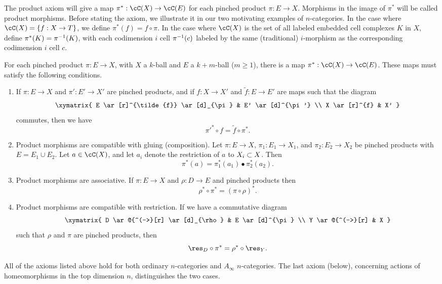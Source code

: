 The product axiom will give a map $\pi^*:\cC(X)\to \cC(E)$ for each pinched product
$\pi:E\to X$.
Morphisms in the image of $\pi^*$ will be called product morphisms.
Before stating the axiom, we illustrate it in our two motivating examples of $n$-categories.
In the case where $\cC(X) = \{f: X\to T\}$, we define $\pi^*(f) = f\circ\pi$.
In the case where $\cC(X)$ is the set of all labeled embedded cell complexes $K$ in $X$, 
define $\pi^*(K) = \pi^{-1}(K)$, with each codimension $i$ cell $\pi^{-1}(c)$ labeled by the
same (traditional) $i$-morphism as the corresponding codimension $i$ cell $c$.


\addtocounter{axiom}{-1}
\begin{axiom}
For each pinched product $\pi:E\to X$, with $X$ a $k$-ball and $E$ a $k{+}m$-ball ($m\ge 1$),
there is a map $\pi^*:\cC(X)\to \cC(E)$.
These maps must satisfy the following conditions.
\begin{enumerate}
\item
If $\pi:E\to X$ and $\pi':E'\to X'$ are pinched products, and
if $f:X\to X'$ and $\tilde{f}:E \to E'$ are maps such that the diagram
\[ \xymatrix{
	E \ar[r]^{\tilde{f}} \ar[d]_{\pi} & E' \ar[d]^{\pi'} \\
	X \ar[r]^{f} & X'
} \]
commutes, then we have 
\[
	\pi'^*\circ f = \tilde{f}\circ \pi^*.
\]
\item
Product morphisms are compatible with gluing (composition).
Let $\pi:E\to X$, $\pi_1:E_1\to X_1$, and $\pi_2:E_2\to X_2$ 
be pinched products with $E = E_1\cup E_2$.
Let $a\in \cC(X)$, and let $a_i$ denote the restriction of $a$ to $X_i\subset X$.
Then 
\[
	\pi^*(a) = \pi_1^*(a_1)\bullet \pi_2^*(a_2) .
\]
\item
Product morphisms are associative.
If $\pi:E\to X$ and $\rho:D\to E$ and pinched products then
\[
	\rho^*\circ\pi^* = (\pi\circ\rho)^* .
\]
\item
Product morphisms are compatible with restriction.
If we have a commutative diagram
\[ \xymatrix{
	D \ar@{^(->}[r] \ar[d]_{\rho} & E \ar[d]^{\pi} \\
	Y \ar@{^(->}[r] & X
} \]
such that $\rho$ and $\pi$ are pinched products, then
\[
	\res_D\circ\pi^* = \rho^*\circ\res_Y .
\]
\end{enumerate}
\end{axiom}


\medskip

All of the axioms listed above hold for both ordinary $n$-categories and $A_\infty$ $n$-categories.
The last axiom (below), concerning actions of 
homeomorphisms in the top dimension $n$, distinguishes the two cases.

